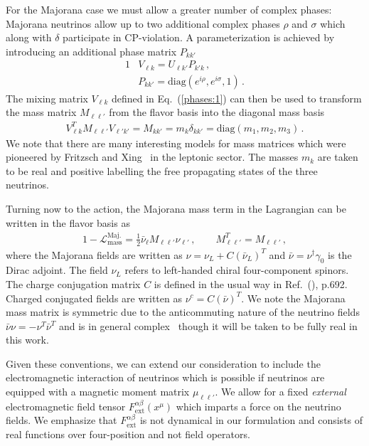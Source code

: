 \documentclass[addchapnum]{ws-rv961x669} %
\newcommand{\req}[1]{Eq.~(\ref{#1})}
\begin{document}
For the Majorana case we must allow a greater number of complex phases: Majorana neutrinos allow up to two additional complex phases $\rho$ and $\sigma$ which along with $\delta$ participate in CP-violation. A parameterization is achieved by introducing an additional phase matrix $P_{kk'}$
\begin{alignat}{1}
\label{phases:1} &V_{\ell k} = U_{\ell k'}P_{k'k}\,,\\
\label{phases:3} &P_{kk'} = \mathrm{diag}(e^{i\rho},e^{i\sigma},1)\,.
\end{alignat}
The mixing matrix $V_{\ell k}$ defined in \req{phases:1} can then be used to transform the mass matrix $M_{\ell\ell'}$ from the flavor basis into the diagonal mass basis 
\begin{align}
\label{diag:1}
V_{\ell k}^{T}M_{\ell\ell'}V_{\ell'k'} = M_{kk'} = m_{k}\delta_{kk'} = \mathrm{diag}(m_{1},m_{2},m_{3})\,.
\end{align}
We note that there are many interesting models for mass matrices which were pioneered by Fritzsch and Xing~\cite{Fritzsch:1995dj,Fritzsch:1998xs,Fritzsch:1999ee,Xing:2000ik} in the leptonic sector. The masses $m_{k}$ are taken to be real and positive labelling the free propagating states of the three neutrinos.

Turning now to the action, the Majorana mass term in the Lagrangian can be written in the flavor basis as
\begin{alignat}{1}
\label{mass:1} -\mathcal{L}_{\mathrm{mass}}^{\mathrm{Maj.}}=\frac{1}{2}\bar\nu_{\ell}M_{\ell\ell'}\nu_{\ell'}\,,\qquad
M_{\ell\ell'}^{T}=M_{\ell\ell'}\,,
\end{alignat}
where the Majorana fields are written as $\nu=\nu_{L}+C(\bar\nu_{L})^{T}$ and $\bar\nu=\nu^{\dag}\gamma_{0}$ is the Dirac adjoint. The field $\nu_{L}$ refers to left-handed chiral four-component spinors. The charge conjugation matrix $C$ is defined in the usual way in Ref.~(\citeauthor{Itzykson:1980rh}), p.692. Charged conjugated fields are written as $\nu^{c}=C(\bar\nu)^{T}$. We note the Majorana mass matrix is symmetric due to the anticommuting nature of the neutrino fields $\bar\nu\nu=-\nu^{T}\bar\nu^{T}$ and is in general complex~\cite{Adhikary:2013bma,giunti2007fundamentals} though it will be taken to be fully real in this work.

Given these conventions, we can extend our consideration to include the electromagnetic interaction of neutrinos which is possible if neutrinos are equipped with a magnetic moment matrix $\mu_{\ell\ell'}$. We allow for a fixed \emph{external} electromagnetic field tensor $F^{\alpha\beta}_\mathrm{ext}(x^{\mu})$ which imparts a force on the neutrino fields. We emphasize that $F^{\alpha\beta}_\mathrm{ext}$ is not dynamical in our formulation and consists of real functions over four-position and not field operators.
\end{document}
